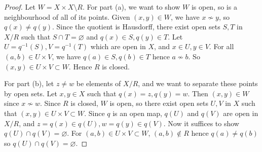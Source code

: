 \begin{proof}
	Let \( W = X \times X \setminus R \).
	For part (a), we want to show \( W \) is open, so is a neighbourhood of all of its points.
	Given \( (x,y) \in W \), we have \( x \not\sim y \), so \( q(x) \neq q(y) \).
	Since the quotient is Hausdorff, there exist open sets \( S, T \) in \( X/R \) such that \( S \cap T = \varnothing \) and \( q(x) \in S, q(y) \in T \).
	Let \( U = q^{-1}(S), V = q^{-1}(T) \) which are open in \( X \), and \( x \in U, y \in V \).
	For all \( (a,b) \in U \times V \), we have \( q(a) \in S, q(b) \in T \) hence \( a \not\sim b \).
	So \( (x,y) \in U \times V \subset W \).
	Hence \( R \) is closed.

	For part (b), let \( z \neq w \) be elements of \( X/R \), and we want to separate these points by open sets.
	Let \( x,y \in X \) such that \( q(x) = z, q(y) = w \).
	Then \( (x,y) \in W \) since \( x \not\sim w \).
	Since \( R \) is closed, \( W \) is open, so there exist open sets \( U, V \) in \( X \) such that \( (x,y) \in U \times V \subset W \).
	Since \( q \) is an open map, \( q(U) \) and \( q(V) \) are open in \( X/R \), and \( z = q(x) \in q(U), w = q(y) \in q(V) \).
	Now it suffices to show \( q(U) \cap q(V) = \varnothing \).
	For \( (a,b) \in U \times V \subset W \), \( (a,b) \not\in R \) hence \( q(a) \neq q(b) \) so \( q(U) \cap q(V) = \varnothing \).
\end{proof}

